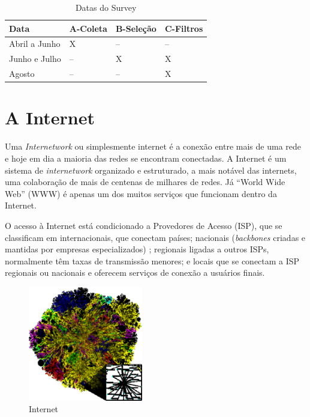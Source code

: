 \documentclass[conference,compsoc]{IEEEtran}
\begin{document}
\begin{enumerate}
  \begin{table}[htbp]
  \scriptsize
  \centering
  \caption{Datas do Survey}
  \begin{tabular}{|p{18mm}|p{8mm}|p{8mm}|p{8mm}|}
  \hline
  Data & A-Coleta & B-Seleção & C-Filtros \\
  \hline
  Abril a Junho & X & -- & -- \\ \hline
  Junho e Julho & -- & X & X \\ \hline
  Agosto & -- & -- & X \\ \hline

  \end{tabular}
  \end{table}


\end{enumerate}

\section{A Internet}

Uma \textit{Internetwork} ou simplesmente internet é a conexão entre mais de uma rede e hoje em dia a maioria das redes se encontram conectadas.  A Internet é um sistema de \textit{internetwork} organizado e estruturado, a mais notável das internets, uma colaboração de mais de centenas de milhares de redes. Já ``World Wide Web'' (WWW) é apenas um dos muitos serviços que funcionam dentro da Internet. 

O acesso à Internet está condicionado a Provedores de Acesso (ISP), que se classificam em internacionais, que conectam países; nacionais (\textit{backbones} criadas e mantidas por empresas especializados) ; regionais ligadas a outros ISPs, normalmente têm taxas de transmissão menores; e locais que se conectam a ISP regionais ou nacionais e oferecem serviços de conexão a usuários finais.


\begin{figure}[!h]
\centering
\caption{Internet}
\includegraphics[width=50mm]{Figuras/internet_map.eps}
\end{figure}
\end{document}
